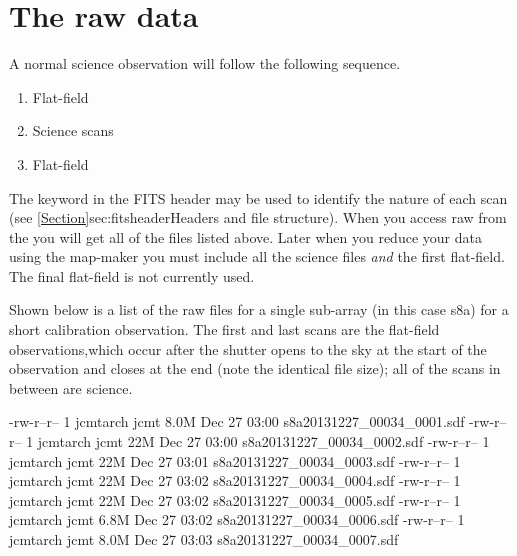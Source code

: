 

\section{The raw data}
\label{sec:rawdata}
A normal science observation will follow the following sequence.

\begin{enumerate}\itemsep-0.2em
\item Flat-field
\item Science scans
\item Flat-field
\end{enumerate}

The  keyword in the FITS header may be used to
identify the nature of each scan (see
\cref{Section}{sec:fitsheader}{Headers and file structure}).  When you
access raw from the  you
will get all of the files listed above. Later when you reduce your
data using the map-maker you must include all the science files
\emph{and} the first flat-field.  The final flat-field is not
currently used.

Shown below is a list of the raw files for a single sub-array (in this
case s8a) for a short calibration observation. The first and last
scans are the flat-field observations,which occur after the shutter
opens to the sky at the start of the observation and closes at the end
(note the identical file size); all of the scans in between are
science.


\begin{terminalv}
\end{terminalv}

\begin{terminalv}
-rw-r--r-- 1 jcmtarch jcmt 8.0M Dec 27 03:00 s8a20131227_00034_0001.sdf
-rw-r--r-- 1 jcmtarch jcmt  22M Dec 27 03:00 s8a20131227_00034_0002.sdf
-rw-r--r-- 1 jcmtarch jcmt  22M Dec 27 03:01 s8a20131227_00034_0003.sdf
-rw-r--r-- 1 jcmtarch jcmt  22M Dec 27 03:02 s8a20131227_00034_0004.sdf
-rw-r--r-- 1 jcmtarch jcmt  22M Dec 27 03:02 s8a20131227_00034_0005.sdf
-rw-r--r-- 1 jcmtarch jcmt 6.8M Dec 27 03:02 s8a20131227_00034_0006.sdf
-rw-r--r-- 1 jcmtarch jcmt 8.0M Dec 27 03:03 s8a20131227_00034_0007.sdf
\end{terminalv}

